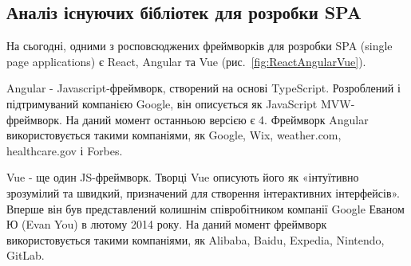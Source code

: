 \subsection{Аналіз існуючих бібліотек для розробки SPA}

На сьогодні, одними з росповсюджених фреймворків для розробки SPA (single page applications) є React, Angular та Vue (рис.~\ref{fig:ReactAngularVue}).


Angular - Javascript-фреймворк, створений на основі TypeScript. Розроблений і підтримуваний компанією Google, він описується як JavaScript MVW-фреймворк. На даний момент останньою версією є 4. Фреймворк Angular використовується такими компаніями, як Google, Wix, weather.com, healthcare.gov і Forbes.

Vue - ще один JS-фреймворк. Творці Vue описують його як «інтуїтивно зрозумілий та швидкий, призначений для створення інтерактивних інтерфейсів». Вперше він був представлений колишнім співробітником компанії Google Еваном Ю (Evan You) в лютому 2014 року. На даний момент фреймворк використовується такими компаніями, як Alibaba, Baidu, Expedia, Nintendo, GitLab.
